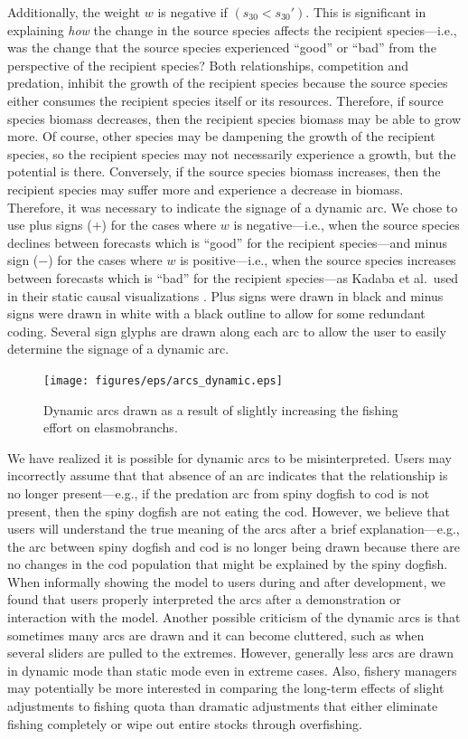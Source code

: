 Additionally, the weight $w$ is negative if $(s_{30} < s_{30}')$.  This is significant in explaining \textit{how} the change in the source species affects the recipient species---i.e., was the change that the source species experienced ``good'' or ``bad'' from the perspective of the recipient species?  Both relationships, competition and predation, inhibit the growth of the recipient species because the source species either consumes the recipient species itself or its resources.  Therefore, if source species biomass decreases, then the recipient species biomass may be able to grow more.  Of course, other species may be dampening the growth of the recipient species, so the recipient species may not necessarily experience a growth, but the potential is there.  Conversely, if the source species biomass increases, then the recipient species may suffer more and experience a decrease in biomass.  Therefore, it was necessary to indicate the signage of a dynamic arc.  We chose to use plus signs ($+$) for the cases where $w$ is negative---i.e., when the source species declines between forecasts which is ``good'' for the recipient species---and minus sign ($-$) for the cases where $w$ is positive---i.e., when the source species increases between forecasts which is ``bad'' for the recipient species---as Kadaba et al.\ used in their static causal visualizations \cite{kadaba2007}.  Plus signs were drawn in black and minus signs were drawn in white with a black outline to allow for some redundant coding.  Several sign glyphs are drawn along each arc to allow the user to easily determine the signage of a dynamic arc.

\begin{figure}[h]
	\centering
	\texttt{[image: figures/eps/arcs\_dynamic.eps]}
	\caption{Dynamic arcs drawn as a result of slightly increasing the fishing effort on elasmobranchs.}
	\label{fig:arcs_dynamic}
\end{figure}


We have realized it is possible for dynamic arcs to be misinterpreted.  Users may incorrectly assume that that absence of an arc indicates that the relationship is no longer present---e.g., if the predation arc from spiny dogfish to cod is not present, then the spiny dogfish are not eating the cod.  However, we believe that users will understand the true meaning of the arcs after a brief explanation---e.g., the arc between spiny dogfish and cod is no longer being drawn because there are no changes in the cod population that might be explained by the spiny dogfish.  When informally showing the model to users during and after development, we found that users properly interpreted the arcs after a demonstration or interaction with the model.  Another possible criticism of the dynamic arcs is that sometimes many arcs are drawn and it can become cluttered, such as when several sliders are pulled to the extremes.  However, generally less arcs are drawn in dynamic mode than static mode even in extreme cases.  Also, fishery managers may potentially be more interested in comparing the long-term effects of slight adjustments to fishing quota than dramatic adjustments that either eliminate fishing completely or wipe out entire stocks through overfishing.

